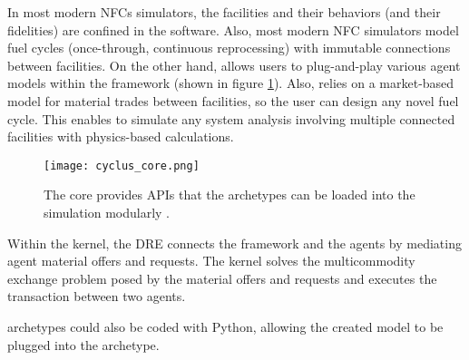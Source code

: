 In most modern \glspl{NFC} simulators, the facilities and their
behaviors (and their fidelities) are confined in the software.
Also, most modern \gls{NFC} simulators model
fuel cycles (once-through, continuous reprocessing)
with immutable connections between facilities. On the
other hand, \Cyclus allows users to plug-and-play various agent models
within the \Cyclus framework (shown in figure \ref{fig:core}).
Also, \Cyclus relies on a market-based model
for material trades between facilities, so the user can design
any novel fuel cycle. This enables \Cyclus to simulate any system analysis
involving multiple connected facilities with physics-based
calculations.


\begin{figure}[htbp!]
    \begin{center}
        \texttt{[image: cyclus\_core.png]}
    \end{center}
    \caption{The \Cyclus core provides APIs that the archetypes
            can be loaded into the simulation modularly
            \cite{huff_fundamental_2016}.}
    \label{fig:core}
\end{figure}

Within the \Cyclus kernel, the \gls{DRE} connects
the framework and the agents by mediating agent material
offers and requests.
The kernel solves the multicommodity exchange problem
posed by the material offers and requests and executes
the transaction between two agents.

\Cyclus archetypes could also be coded with Python,
allowing the created model to be plugged into the archetype.
